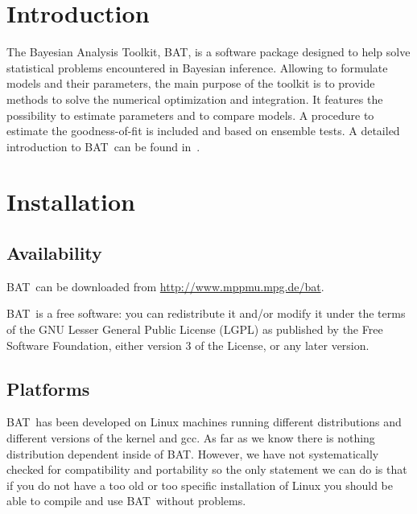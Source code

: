 \documentclass[11pt, a4paper]{article}
\newcommand{\bat}{{\sc BAT}}
\begin{document}
\section{Introduction}
\label{section:introduction}

The Bayesian Analysis Toolkit, \bat, is a software package designed to
help solve statistical problems encountered in Bayesian
inference. Allowing to formulate models and their parameters, the main
purpose of the toolkit is to provide methods to solve the numerical
optimization and integration. It features the possibility to estimate
parameters and to compare models. A procedure to estimate the
goodness-of-fit is included and based on ensemble tests. A detailed
introduction to \bat\ can be found in~\cite{Caldwell:2008fw}.


\section{Installation}
\label{section:installation}

\subsection{Availability}

\bat\ can be downloaded from \url{http://www.mppmu.mpg.de/bat}.

\bat\ is a free software: you can redistribute it and/or modify it
under the terms of the GNU Lesser General Public License (LGPL) as
published by the Free Software Foundation, either version 3 of
the License, or any later version.


\subsection{Platforms}

\bat\ has been developed on Linux machines running different distributions
and different versions of the kernel and gcc. As far as we know there
is nothing distribution dependent inside of \bat. However, we have not
systematically checked for compatibility and portability so the only
statement we can do is that if you do not have a too old or too
specific installation of Linux you should be able to compile and use
\bat\ without problems.
\end{document}
